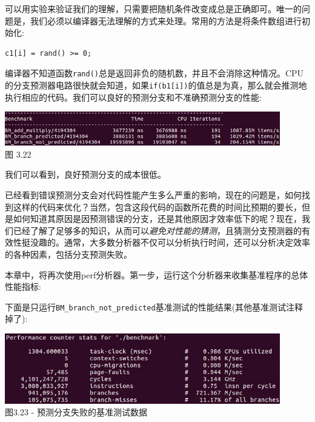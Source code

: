 可以用实验来验证我们的理解，只需要把随机条件改变成总是正确即可。唯一的问题是，我们必须以编译器无法理解的方式来处理。常用的方法是将条件数组进行初始化:

\begin{lstlisting}[style=styleCXX]
c1[i] = rand() >= 0;
\end{lstlisting}

编译器不知道函数\texttt{rand()}总是返回非负的随机数，并且不会消除这种情况。CPU的分支预测器电路很快就会知道，如果\texttt{if(b1[i])}的值总是为真，那么就会推测地执行相应的代码。我们可以良好的预测分支和不准确预测分支的性能:

\begin{center}
\includegraphics[width=0.9\textwidth]{content/1/chapter3/images/22.jpg}\\
图 3.22
\end{center}

我们可以看到，良好预测分支的成本很低。


已经看到错误预测分支会对代码性能产生多么严重的影响，现在的问题是，如何找到这样的代码来优化？当然，包含这段代码的函数所花费的时间比预期的要长，但是如何知道其原因是因预测错误的分支，还是其他原因才效率低下的呢？现在，我们已经了解了足够多的知识，从而可以\textit{避免对性能的猜测}，且猜测分支预测器的有效性挺没趣的。通常，大多数分析器不仅可以分析执行时间，还可以分析决定效率的各种因素，包括分支预测失败。

本章中，将再次使用perf分析器。第一步，运行这个分析器来收集基准程序的总体性能指标:


下面是只运行\texttt{BM\_branch\_not\_predicted}基准测试的性能结果(其他基准测试注释掉了):

\begin{center}
\includegraphics[width=0.9\textwidth]{content/1/chapter3/images/23.jpg}\\
图3.23 - 预测分支失败的基准测试数据
\end{center}

